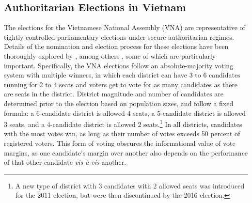 \documentclass[12pt]{article}
\newcommand{\1}{\mathbbm{1}}
\begin{document}


\subsection{Authoritarian Elections in Vietnam}
\label{sec:vietnam_overview}

The elections for the Vietnamese National Assembly (VNA) are representative of tightly-controlled parliamentary elections under secure authoritarian regimes. Details of the nomination and election process for these elections have been thoroughly explored by \cite{MaleskySchuler2011}, among others \citep[e.g][]{Gainsborough2005}, some of which are particularly important. Specifically, the VNA elections follow an absolute-majority voting system with multiple winners, in which each district can have 3 to 6 candidates running for 2 to 4 seats and voters get to vote for as many candidates as there are seats in the district. District magnitude and number of candidates are determined prior to the election based on population sizes, and follow a fixed formula: a 6-candidate district is allowed 4 seats, a 5-candidate district is allowed 3 seats, and a 4-candidate district is allowed 2 seats.\footnote{A new type of district with 3 candidates with 2 allowed seats was introduced for the 2011 election, but were then discontinued by the 2016 election.} In all districts, candidates with the most votes win, as long as their number of votes exceeds 50 percent of registered voters. This form of voting obscures the informational value of vote margins, as one candidate's margin over another also depends on the performance of that other candidate \textit{vis-\`{a}-vis} another.
\end{document}
